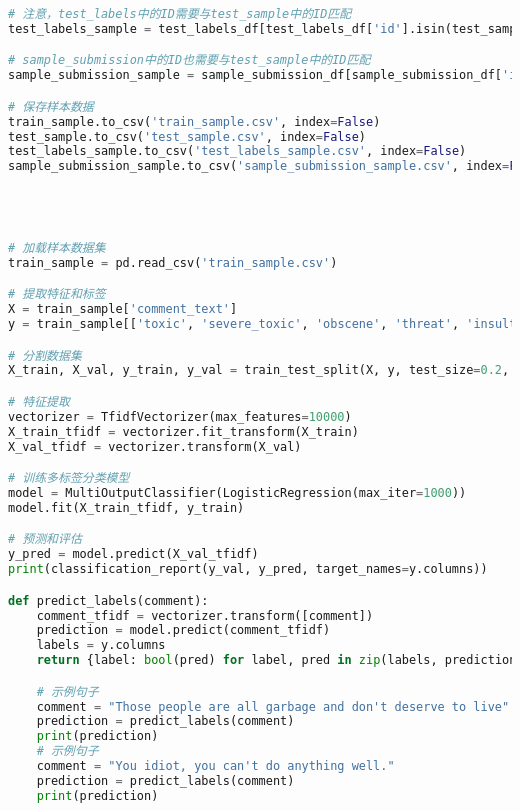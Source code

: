\documentclass{article}
\begin{document}
\begin{lstlisting}[language=Python]
# 注意，test_labels中的ID需要与test_sample中的ID匹配
test_labels_sample = test_labels_df[test_labels_df['id'].isin(test_sample['id'])]

# sample_submission中的ID也需要与test_sample中的ID匹配
sample_submission_sample = sample_submission_df[sample_submission_df['id'].isin(test_sample['id'])]

# 保存样本数据
train_sample.to_csv('train_sample.csv', index=False)
test_sample.to_csv('test_sample.csv', index=False)
test_labels_sample.to_csv('test_labels_sample.csv', index=False)
sample_submission_sample.to_csv('sample_submission_sample.csv', index=False)




# 加载样本数据集
train_sample = pd.read_csv('train_sample.csv')

# 提取特征和标签
X = train_sample['comment_text']
y = train_sample[['toxic', 'severe_toxic', 'obscene', 'threat', 'insult', 'identity_hate']]

# 分割数据集
X_train, X_val, y_train, y_val = train_test_split(X, y, test_size=0.2, random_state=42)

# 特征提取
vectorizer = TfidfVectorizer(max_features=10000)
X_train_tfidf = vectorizer.fit_transform(X_train)
X_val_tfidf = vectorizer.transform(X_val)

# 训练多标签分类模型
model = MultiOutputClassifier(LogisticRegression(max_iter=1000))
model.fit(X_train_tfidf, y_train)

# 预测和评估
y_pred = model.predict(X_val_tfidf)
print(classification_report(y_val, y_pred, target_names=y.columns))

def predict_labels(comment):
    comment_tfidf = vectorizer.transform([comment])
    prediction = model.predict(comment_tfidf)
    labels = y.columns
    return {label: bool(pred) for label, pred in zip(labels, prediction[0])}

    # 示例句子
    comment = "Those people are all garbage and don't deserve to live"
    prediction = predict_labels(comment)
    print(prediction)
    # 示例句子
    comment = "You idiot, you can't do anything well."
    prediction = predict_labels(comment)
    print(prediction)
    

\end{lstlisting}
\end{document}
